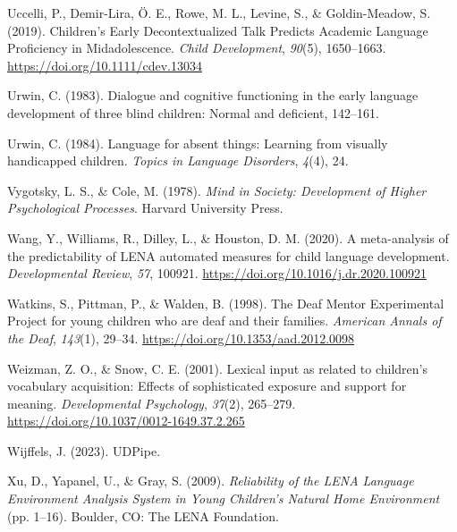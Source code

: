 \documentclass[
  man,floatsintext]{apa6}
\newlength{\cslhangindent}
\newlength{\cslentryspacingunit} %
\newenvironment{CSLReferences}[2] %
 {%
  \setlength{\parindent}{0pt}
  \ifodd #1
  \let\oldpar\par
  \def\par{\hangindent=\cslhangindent\oldpar}
  \fi
  \setlength{\parskip}{#2\cslentryspacingunit}
 }%
 {}
\begin{document}
\begin{CSLReferences}{1}{0}
\leavevmode{}%
Uccelli, P., Demir-Lira, Ö. E., Rowe, M. L., Levine, S., \& Goldin-Meadow, S. (2019). Children's {Early Decontextualized Talk Predicts Academic Language Proficiency} in {Midadolescence}. \emph{Child Development}, \emph{90}(5), 1650--1663. \url{https://doi.org/10.1111/cdev.13034}

\leavevmode{}%
Urwin, C. (1983). Dialogue and cognitive functioning in the early language development of three blind children: {Normal} and deficient, 142--161.

\leavevmode{}%
Urwin, C. (1984). Language for absent things: Learning from visually handicapped children. \emph{Topics in Language Disorders}, \emph{4}(4), 24.

\leavevmode{}%
Vygotsky, L. S., \& Cole, M. (1978). \emph{Mind in {Society}: {Development} of {Higher Psychological Processes}}. {Harvard University Press}.

\leavevmode{}%
Wang, Y., Williams, R., Dilley, L., \& Houston, D. M. (2020). A meta-analysis of the predictability of {LENA}\texttrademark{} automated measures for child language development. \emph{Developmental Review}, \emph{57}, 100921. \url{https://doi.org/10.1016/j.dr.2020.100921}

\leavevmode{}%
Watkins, S., Pittman, P., \& Walden, B. (1998). The {Deaf Mentor Experimental Project} for young children who are deaf and their families. \emph{American Annals of the Deaf}, \emph{143}(1), 29--34. \url{https://doi.org/10.1353/aad.2012.0098}

\leavevmode{}%
Weizman, Z. O., \& Snow, C. E. (2001). Lexical input as related to children's vocabulary acquisition: Effects of sophisticated exposure and support for meaning. \emph{Developmental Psychology}, \emph{37}(2), 265--279. \url{https://doi.org/10.1037/0012-1649.37.2.265}

\leavevmode{}%
Wijffels, J. (2023). {UDPipe}.

\leavevmode{}%
Xu, D., Yapanel, U., \& Gray, S. (2009). \emph{Reliability of the {LENA Language Environment Analysis System} in {Young Children}'s {Natural Home Environment}} (pp. 1--16). {Boulder, CO}: {The LENA Foundation}.


\end{CSLReferences}
\end{document}
